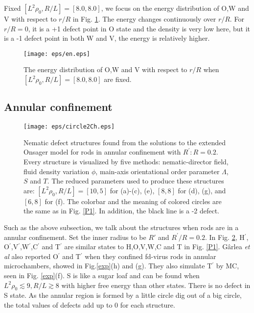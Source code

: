 \documentclass[prl,twocolumn,preprintnumbers,reprint]{revtex4}
\begin{document}
Fixed $[L^2\rho_0,R/L]=[8.0,8.0]$, we focus on the energy distribution of O,W and V with respect to $r/R$ in Fig. \ref{en}. The energy changes continuously over $r/R$. For $r/R=0$, it is a +1 defect point in O state and the density is very low here, but it is a -1 defect point in both W and V, the energy is relatively higher.

\begin{figure}[!t]\centering
\texttt{[image: eps/en.eps]}
\caption{The energy distribution of O,W and V with respect to $r/R$ when $[L^2\rho_0,R/L]=[8.0,8.0]$ are fixed. } \label{en}
\end{figure}

\subsection{Annular confinement}
\begin{figure}[!t]\centering
\texttt{[image: eps/circle2Ch.eps]}
\caption{Nematic defect structures found from the solutions to the extended Onsager model for rods in annular confinement with $R^\prime:R=0.2$. Every structure is visualized by five methods: nematic-director field, fluid density variation $\phi$, main-axis orientational order parameter $\Lambda$, $S$ and $T$. The reduced parameters used to produce these structures are: $[L^2 \rho_0, R/L]  = [10, 5]$ for (a)-(c), (e), $[8, 8]$ for (d), (g), and $[6, 8]$ for (f). The colorbar and the meaning of colored circles are the same as in Fig. \ref{P1}. In addition, the black line is a -2 defect.} \label{Q1}
\end{figure}

Such as the above subsection, we talk about the structures when rods are in a annular confinement. Set the inner radius to be $R'$ and $R^\prime/R=0.2$. In Fig. \ref{Q1}, H$^\prime$, O$^\prime$,V$^\prime$,W$^\prime$,C$^\prime$ and T$^\prime$ are similar states to H,O,V,W,C and T in Fig. \ref{P1}. G\^{a}rlea \emph{et al} also reported O$^\prime$ and T$^\prime$ when they confined fd-virus rods in annular microchambers\cite{G2016Finite}, showed in Fig.\ref{exp}(h) and (g). They also simulate T$^\prime$ by MC, seen in Fig. \ref{exp}(f). S is like a sugar loaf and can be found when $L^2\rho_0\lesssim9, R/L\gtrsim8$ with higher free energy than other states. There is no defect in S state. As the annular region is formed by a little circle dig out of a big circle, the total values of defects add up to 0 for each structure.
\end{document}
